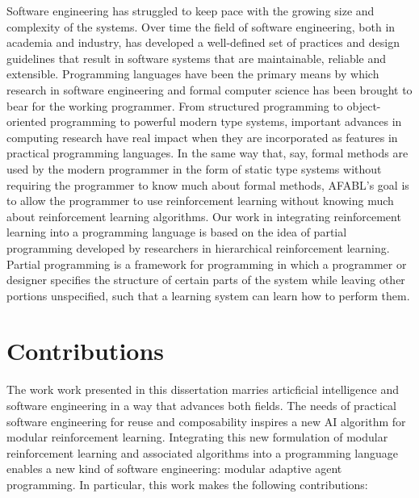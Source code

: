 Software engineering has struggled to keep pace with the growing size and complexity of the systems. Over time the field of software engineering, both in academia and industry, has developed a well-defined set of practices and design guidelines that result in software systems that are maintainable, reliable and extensible. Programming languages have been the primary means by which research in software engineering and formal computer science has been brought to bear for the working programmer. From structured programming to object-oriented programming to powerful modern type systems, important advances in computing research have real impact when they are incorporated as features in practical programming languages. In the same way that, say, formal methods are used by the modern programmer in the form of static type systems without requiring the programmer to know much about formal methods, AFABL's goal is to allow the programmer to use reinforcement learning without knowing much about reinforcement learning algorithms. Our work in integrating reinforcement learning into a programming language is based on the idea of partial programming developed by researchers in hierarchical reinforcement learning. Partial programming is a framework for programming in which a programmer or designer specifies the structure of certain parts of the system while leaving other portions unspecified, such that a learning system can learn how to perform them.


\section{Contributions}

The work work presented in this dissertation marries articficial intelligence and software engineering in a way that advances both fields. The needs of practical software engineering for reuse and composability inspires a new AI algorithm for modular reinforcement learning. Integrating this new formulation of modular reinforcement learning and associated algorithms into a programming language enables a new kind of software engineering: modular adaptive agent programming. In particular, this work makes the following contributions:

